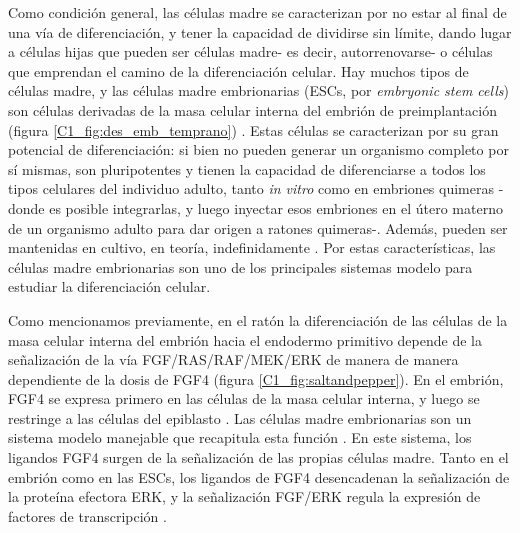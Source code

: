\documentclass[./main.tex]{subfiles}
\begin{document}
Como condición general, las células madre se caracterizan por no estar al final de una vía de diferenciación, y tener la capacidad de dividirse sin límite, dando lugar a células hijas que pueden ser células madre- es decir, autorrenovarse- o células que emprendan el camino de la diferenciación celular. Hay muchos tipos de células madre, y las células madre embrionarias (ESCs, por \textit{embryonic stem cells}) son células derivadas de la masa celular interna del embrión de preimplantación (figura \ref{C1_fig:des_emb_temprano}) \cite{Ohtsuka2008}. Estas células se caracterizan por su gran potencial de diferenciación: si bien no pueden generar un organismo completo por sí mismas, son pluripotentes y tienen la capacidad de diferenciarse a todos los tipos celulares del individuo adulto, tanto \textit{in vitro} como en embriones quimeras -donde es posible integrarlas, y luego inyectar esos embriones en el útero materno de un organismo adulto para dar origen a ratones quimeras-\cite{Evans1981, Martin1981,Moustafa1972,Gardner1968}. Además, pueden ser mantenidas en cultivo, en teoría, indefinidamente \cite{Hiyama2007}. Por estas características, las células madre embrionarias son uno de los principales sistemas modelo para estudiar la diferenciación celular. 


Como mencionamos previamente, en el ratón la diferenciación de las células de la masa celular interna del embrión hacia el endodermo primitivo depende de la señalización de la vía FGF/RAS/RAF/MEK/ERK de manera de manera dependiente de la dosis de FGF4 (figura \ref{C1_fig:saltandpepper}). En el embrión, FGF4 se expresa primero en las células de la masa celular interna, y luego se restringe a las células del epiblasto \cite{Gun2010}. Las células madre embrionarias son un sistema modelo manejable que recapitula esta función \cite{Raina2021,Schroeter2015,Kunath2007,Molotkov2017,Comoul2003}. En este sistema, los ligandos FGF4 surgen de la señalización de las propias células madre. Tanto en el embrión como en las ESCs, los ligandos de FGF4 desencadenan la señalización de la proteína efectora ERK, y la señalización FGF/ERK regula la expresión de factores de transcripción \cite{Kang2013,Krawchuk2013,Kunath2007,Nichols2009,Boroviak2014,Stavridis2007}. 
\end{document}
